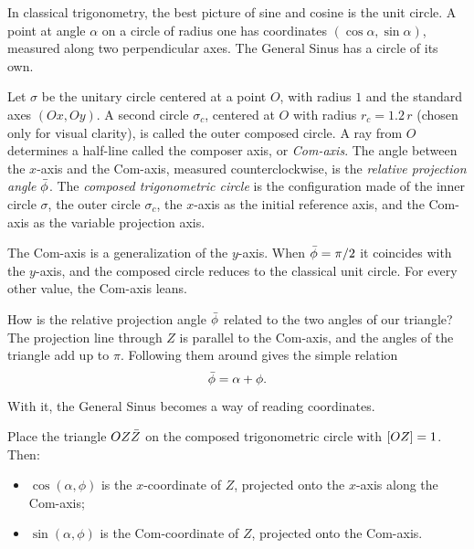 In classical trigonometry, the best picture of sine and cosine is the unit circle. A point at angle $\alpha$ on a circle of radius one has coordinates $(\cos\alpha, \sin\alpha)$, measured along two perpendicular axes. The General Sinus has a circle of its own.

\begin{definition}\label{def:composed-circle}
Let $\sigma$ be the unitary circle centered at a point $O$, with radius $1$ and the standard axes $(Ox, Oy)$. A second circle $\sigma_c$, centered at $O$ with radius $r_c = 1.2\, r$ (chosen only for visual clarity), is called the outer composed circle. A ray from $O$ determines a half-line called the composer axis, or \emph{Com-axis}. The angle between the $x$-axis and the Com-axis, measured counterclockwise, is the \emph{relative projection angle} $\bar{\phi}$. The \emph{composed trigonometric circle} is the configuration made of the inner circle $\sigma$, the outer circle $\sigma_c$, the $x$-axis as the initial reference axis, and the Com-axis as the variable projection axis.
\end{definition}

The Com-axis is a generalization of the $y$-axis. When $\bar{\phi} = \pi/2$ it coincides with the $y$-axis, and the composed circle reduces to the classical unit circle. For every other value, the Com-axis leans.

How is the relative projection angle $\bar{\phi}$ related to the two angles of our triangle? The projection line through $Z$ is parallel to the Com-axis, and the angles of the triangle add up to $\pi$. Following them around gives the simple relation
\[
\bar{\phi} = \alpha + \phi .
\]
With it, the General Sinus becomes a way of reading coordinates.

\begin{proposition}\label{prop:coordinates}
Place the triangle $OZ\bar{Z}$ on the composed trigonometric circle with $[OZ] = 1$. Then:
\begin{itemize}
  \item $\cos(\alpha, \phi)$ is the $x$-coordinate of $Z$, projected onto the $x$-axis along the Com-axis;
  \item $\sin(\alpha, \phi)$ is the Com-coordinate of $Z$, projected onto the Com-axis.
\end{itemize}
\end{proposition}

